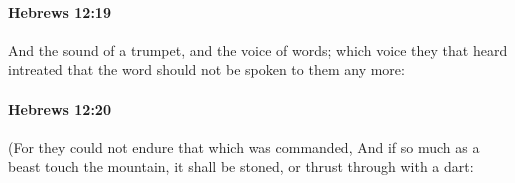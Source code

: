 		\paragraph{Hebrews 12:19} %
			\label{HEBREWS-12-19}

			And the sound of a trumpet, and the voice of words; which voice they that heard intreated that the word should not be spoken to them any more:

			\begin{framed}
			\scriptsize
				\begin{compactdesc}
					\item[SBLG] 
				\end{compactdesc}
			\end{framed}

		\paragraph{Hebrews 12:20} %
			\label{HEBREWS-12-20}

			(For they could not endure that which was commanded, And if so much as a beast touch the mountain, it shall be stoned, or thrust through with a dart:

